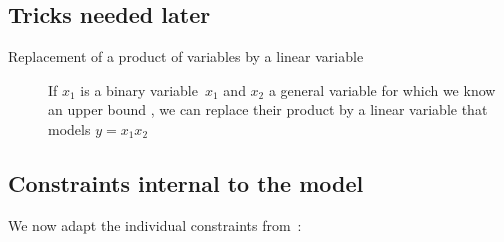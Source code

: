 \documentclass[11pt,reqno]{amsart}
\numberwithin{equation}{section}
\begin{document}
\subsection{Tricks needed later}

\begin{description}
\item[Replacement of a product of variables by a linear variable] If $x_1$ is a binary
  variable~$x_1$ and $x_2$ a general variable for which we know an upper bound , we can replace their product by a linear
  variable that models $y=x_1x_2$  
\end{description}

\subsection{Constraints internal to the model}

We now adapt the individual constraints from~\cite{artigues-etal11}:
\end{document}
